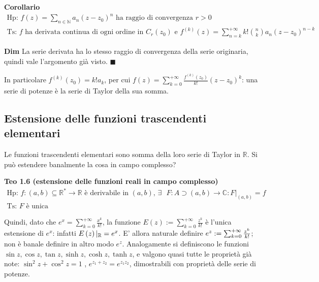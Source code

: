\documentclass{article}
\begin{document}
\textbf{Corollario } 
\begin{gather*}
\text{Hp: }f\left( z\right) =\sum_{n\in 
\mathbb{N}
}a_{n}\left( z-z_{0}\right) ^{n}\text{ ha raggio di convergenza }r>0 \\
\text{Ts: }f\text{ ha derivata continua di ogni ordine in }C_{r}\left(
z_{0}\right) \text{ e }f^{\left( k\right) }\left( z\right)
=\sum_{n=k}^{+\infty }k!\binom{n}{k}a_{n}\left( z-z_{0}\right) ^{n-k}
\end{gather*}

\textbf{Dim} La serie derivata ha lo stesso raggio di convergenza della
serie originaria, quindi vale l'argomento gi\`{a} visto. $\blacksquare $

In particolare $f^{\left( k\right) }\left( z_{0}\right) =k!a_{k}$, per cui $%
f\left( z\right) =\sum_{k=0}^{+\infty }\frac{f^{\left( k\right) }\left(
z_{0}\right) }{k!}\left( z-z_{0}\right) ^{k}$: una serie di potenze \`{e} la
serie di Taylor della sua somma.

\subsection{Estensione delle funzioni trascendenti elementari}

Le funzioni trascendenti elementari sono somma della loro serie di Taylor in 
$%
\mathbb{R}
$. Si pu\`{o} estendere banalmente la cosa in campo complesso?

\textbf{Teo 1.6 (estensione delle funzioni reali in campo complesso)} 
\begin{gather*}
\text{Hp: }f:\left( a,b\right) \subseteq 
\mathbb{R}
^{\ast }\rightarrow 
\mathbb{R}
\text{ \`{e} derivabile in }\left( a,b\right) \text{, }\exists \text{ }%
F:A\supset \left( a,b\right) \rightarrow 
\mathbb{C}
:F|_{\left( a,b\right) }=f \\
\text{Ts: }F\text{ \`{e} unica}
\end{gather*}

Quindi, dato che $e^{x}=\sum_{k=0}^{+\infty }\frac{x^{k}}{k!}$, la funzione $%
E\left( z\right) :=\sum_{k=0}^{+\infty }\frac{z^{k}}{k!}$ \`{e} l'unica
estensione di $e^{x}$: infatti $E\left( z\right) |_{%
\mathbb{R}
}=e^{x}$. E' allora naturale definire $e^{z}:=\sum_{k=0}^{+\infty }\frac{%
z^{k}}{k!}$; non \`{e} banale definire in altro modo $e^{z}$. Analogamente
si definiscono le funzioni $\sin z,\cos z,\tan z,\sinh z,\cosh z,\tanh z$, e
valgono quasi tutte le propriet\`{a} gi\`{a} note: $\sin ^{2}z+\cos ^{2}z=1$%
, $e^{z_{1}+z_{2}}=e^{z_{1}z_{2}}$, dimostrabili con propriet\`{a} delle
serie di potenze.
\end{document}
